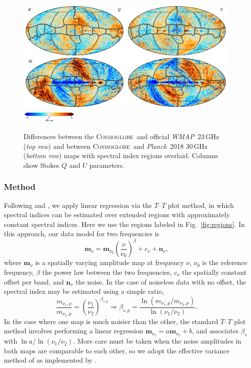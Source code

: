 \documentclass[twocolumn]{../../common/aa}
\def\WMAP{\emph{WMAP}}
\def\Planck{\emph{Planck}}
\newcommand{\cosmoglobe}{\textsc{Cosmoglobe}}
\begin{document}
\begin{figure}
	\centering
	\includegraphics[width=0.99\textwidth]{figures/CG_diff_regions.pdf}\\
        \includegraphics[width=0.25\textwidth]{figures/cbar_5uK.pdf}
	\caption{Differences between the \cosmoglobe\ and official \WMAP\ 23\,GHz (\emph{top row}) and between \cosmoglobe\ and \Planck\ 2018 30\,GHz (\emph{bottom row}) maps with spectral index regions overlaid. Columns show Stokes $Q$ and $U$ parameters.
		}
       \label{fig:diff_regions}
\end{figure}


\subsubsection{Method}
\label{sec:tt_plot_method}

Following \citet{fuskeland2014} and \citet{fuskeland:2019}, we apply linear regression via the $T$--$T$ plot method, in which spectral indices can be estimated over extended regions with approximately constant spectral indices. Here we use the regions labeled in Fig.~\ref{fig:regions}. In this approach, our data model for two frequencies is
\begin{equation}
	\boldsymbol m_\nu = \boldsymbol m_{\nu_0}\left(\frac\nu{\nu_0}\right)^\beta+c_\nu+\boldsymbol n_\nu ,
\end{equation}
where $\boldsymbol m_\nu$ is a spatially varying amplitude map at frequency $\nu$, $\nu_0$ is the reference frequency, $\beta$ the power law between the two frequencies, $c_\nu$ the spatially constant offset per band, and $\boldsymbol n_\nu$ the noise.  In the case of noiseless data with no offset, the spectral index may be estimated using a simple ratio,
\begin{equation}
	\frac{m_{\nu_1,p}}{m_{\nu_2,p}}
	=\left(\frac{\nu_1}{\nu_2}\right)^{\beta_{s,p}}
	\Rightarrow
	\beta_{s,p}=\frac{\ln(m_{\nu_1,p}/m_{\nu_2,p})}{\ln(\nu_1/\nu_2)}.
\end{equation}
In the case where one map is much noisier than the other, the standard $T$--$T$ plot method involves performing  a linear regression $\boldsymbol m_{\nu_1}=a\boldsymbol m_{\nu_2}+b$, and associates $\beta_s$ with $\ln a/\ln(\nu_1/\nu_2)$. More care must be taken when the noise amplitudes in both maps are comparable to each other, so we adopt the effective variance method of \citet{orear1982} as implemented by \citet{fuskeland2014}.
\end{document}
